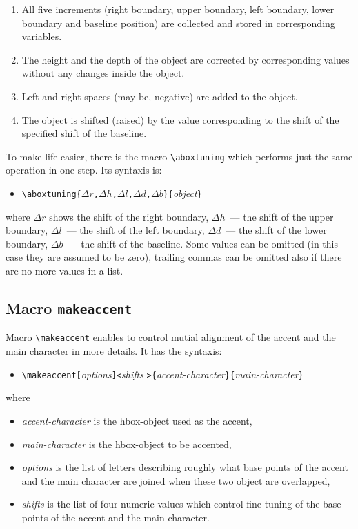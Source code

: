 \begin{enumerate}
\item All five increments (right boundary, upper boundary,
      left boundary, lower boundary and baseline position)
      are collected and stored in corresponding variables.
\item The height and the depth of the object are corrected
      by corresponding values without any changes inside the object.
\item Left and right spaces (may be, negative) are added
      to the object.
\item The object is shifted (raised) by the value corresponding
      to the shift of the specified shift of the baseline.
\end{enumerate}

To make life easier, there is the macro \verb?\aboxtuning?
which performs just the same operation in one step. Its syntaxis is:
\begin{itemize}
\item[]\verb?\aboxtuning{?{\tt $\Delta r$,$\Delta h$,$\Delta l$,$\Delta d$,$\Delta b$}\verb?}{?{\em object}\verb?}?
\end{itemize}
where $\Delta r$ shows the shift of the right boundary,
$\Delta h$~--- the shift of the upper boundary,
$\Delta l$~--- the shift of the left boundary,
$\Delta d$~--- the shift of the lower boundary,
$\Delta b$~--- the shift of the baseline. Some values can be omitted
(in this case they are assumed to be zero), trailing commas
can be omitted also if there are no more values in a list.

\subsection{Macro {\tt\bs{}makeaccent}}

Macro \verb?\makeaccent? enables to control mutial alignment
of the accent and the main character in more details.
It has the syntaxis:
\begin{itemize}
\item[]\verb?\makeaccent[?{\em options}\verb?]<?{\em shifts}%
       \verb?>{?{\em accent-character}\verb?}{?{\em main-character}\verb?}?
\end{itemize}
where
\begin{itemize}
\item
{\em accent-character} is the \textsf{hbox}-object used as the accent,
\item
{\em main-character} is the \textsf{hbox}-object to be accented,
\item
{\em options} is the list of letters describing roughly
what base points of the accent and
the main character are joined when these two object are overlapped,
\item
{\em shifts} is the list of four numeric values which control fine tuning
of the base points of the accent and
the main character.
\end{itemize}

